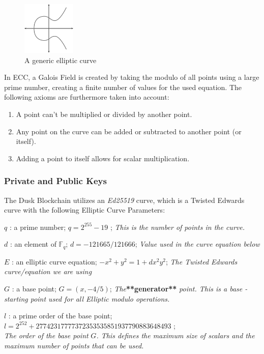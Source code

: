 \begin{figure}
\includegraphics[height=1in, width=1in]{elliptic_bn}
\caption{A generic elliptic curve}
\label{fig:elliptic}
\end{figure}

In ECC, a Galois Field is created by taking the modulo of all points using a large prime number, creating a finite number of values for the used equation. The following axioms are furthermore taken into account:

\begin{enumerate}
\item A point can't be multiplied or divided by another point.
\item Any point on the curve can be added or subtracted to another point (or itself).
\item Adding a point to itself allows for scalar multiplication.
\end{enumerate}

\subsubsection{Private and Public Keys}

The \textrm{Dusk} Blockchain utilizes an \textit{Ed25519} curve, which is a Twisted Edwards curve with the following Elliptic Curve Parameters:

$q$ : a prime number; $q=2^{255}-19$ ; \textit{This is the number of points in the curve.}

$d$ : an element of $\mathbb{F}_q$; $d=-121665/121666$; \textit{Value used in the curve equation below}

$E$ : an elliptic curve equation; $-x^2+y^2=1+dx^2y^2$; \textit{The Twisted Edwards curve/equation we are using}

$G$ : a base point; $G=(x, -4/5)$; \textit{The}\textbf{**generator**} \textit{point. This is a base - starting point used for all Elliptic modulo operations.}

$l$ : a prime order of the base point; \\\space\space\space\space$l=2^{252}+27742317777372353535851937790883648493$ ;\\ \textit{The order of the base point} $G$\textit{. This defines the maximum size of scalars and the maximum number of points that can be used.}

